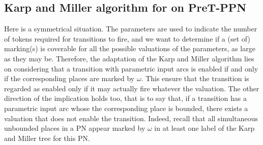 \subsection{Karp and Miller algorithm for \Ucov on PreT-\ac{PPN}}

Here is a symmetrical situation.
The parameters are used to indicate the number of tokens required for transitions to fire, and we want to determine if a (set of) marking(s) is coverable for all the possible valuations of the parameters, as large as they may be.
Therefore, the adaptation of the Karp and Miller algorithm lies on considering that a transition with parametric input arcs is enabled if and only if the corresponding places are marked by $\omega$.
This ensure that the transition is regarded as enabled only if it may actually fire whatever the valuation.
The other direction of the implication holds too, that is to say that, if a transition has a parametric input arc whose the corresponding place is bounded, there exists a valuation that does not enable the transition.
Indeed, recall that all simultaneous unbounded places in a \ac{PN} appear marked by $\omega$ in at least one label of the Karp and Miller tree for this \ac{PN}.

